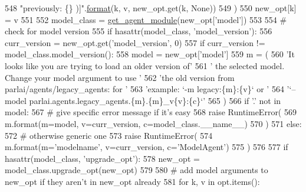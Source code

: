 \begin{DoxyCode}
548                         \textcolor{stringliteral}{"previously: \{\} )]"}.\hyperlink{namespaceparlai_1_1chat__service_1_1services_1_1messenger_1_1shared__utils_a32e2e2022b824fbaf80c747160b52a76}{format}(k, v, new\_opt.get(k, \textcolor{keywordtype}{None}))
549                     )
550                 new\_opt[k] = v
551 
552         model\_class = \hyperlink{namespaceparlai_1_1core_1_1agents_a14a9d134d76ffd0509e50703d0f2c949}{get\_agent\_module}(new\_opt[\textcolor{stringliteral}{'model'}])
553 
554         \textcolor{comment}{# check for model version}
555         \textcolor{keywordflow}{if} hasattr(model\_class, \textcolor{stringliteral}{'model\_version'}):
556             curr\_version = new\_opt.get(\textcolor{stringliteral}{'model\_version'}, 0)
557             \textcolor{keywordflow}{if} curr\_version != model\_class.model\_version():
558                 model = new\_opt[\textcolor{stringliteral}{'model'}]
559                 m = (
560                     \textcolor{stringliteral}{'It looks like you are trying to load an older version of'}
561                     \textcolor{stringliteral}{' the selected model. Change your model argument to use '}
562                     \textcolor{stringliteral}{'the old version from parlai/agents/legacy\_agents: for '}
563                     \textcolor{stringliteral}{'example: `-m legacy:\{m\}:\{v\}` or '}
564                     \textcolor{stringliteral}{'`--model parlai.agents.legacy\_agents.\{m\}.\{m\}\_v\{v\}:\{c\}`'}
565                 )
566                 \textcolor{keywordflow}{if} \textcolor{stringliteral}{'.'} \textcolor{keywordflow}{not} \textcolor{keywordflow}{in} model:
567                     \textcolor{comment}{# give specific error message if it's easy}
568                     \textcolor{keywordflow}{raise} RuntimeError(
569                         m.format(m=model, v=curr\_version, c=model\_class.\_\_name\_\_)
570                     )
571                 \textcolor{keywordflow}{else}:
572                     \textcolor{comment}{# otherwise generic one}
573                     \textcolor{keywordflow}{raise} RuntimeError(
574                         m.format(m=\textcolor{stringliteral}{'modelname'}, v=curr\_version, c=\textcolor{stringliteral}{'ModelAgent'})
575                     )
576 
577         \textcolor{keywordflow}{if} hasattr(model\_class, \textcolor{stringliteral}{'upgrade\_opt'}):
578             new\_opt = model\_class.upgrade\_opt(new\_opt)
579 
580         \textcolor{comment}{# add model arguments to new\_opt if they aren't in new\_opt already}
581         \textcolor{keywordflow}{for} k, v \textcolor{keywordflow}{in} opt.items():

\end{DoxyCode}
